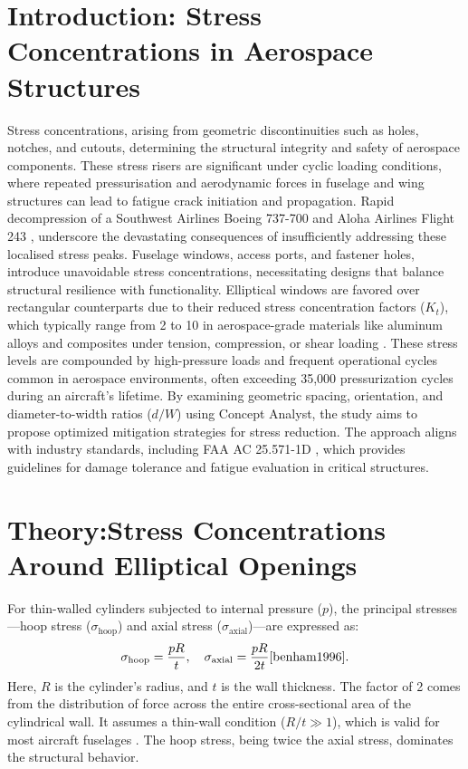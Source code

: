 \documentclass[a4paper,11pt]{article}
\begin{document}
\section{Introduction: Stress Concentrations in Aerospace Structures}
\vspace{-15pt}
Stress concentrations, arising from geometric discontinuities such as holes, notches, and cutouts, determining the structural integrity and safety of aerospace components. These stress risers are significant under cyclic loading conditions, where repeated pressurisation and aerodynamic forces in fuselage and wing structures can lead to fatigue crack initiation and propagation. Rapid decompression of a Southwest Airlines Boeing 737-700 \cite{ntsb2019} and Aloha Airlines Flight 243 \cite{ntsb1989}, underscore the devastating consequences of insufficiently addressing these localised stress peaks. Fuselage windows, access ports, and fastener holes, introduce unavoidable stress concentrations, necessitating designs that balance structural resilience with functionality. Elliptical windows are favored over rectangular counterparts due to their reduced stress concentration factors ($K_t$), which typically range from 2 to 10 in aerospace-grade materials like aluminum alloys and composites under tension, compression, or shear loading \cite{pilkey2020}. These stress levels are compounded by high-pressure loads and frequent operational cycles common in aerospace environments, often exceeding 35,000 pressurization cycles during an aircraft’s lifetime\cite{megson2016}.  By examining geometric spacing, orientation, and diameter-to-width ratios ($d/W$) using Concept Analyst, the study aims to propose optimized mitigation strategies for stress reduction. The approach aligns with industry standards, including FAA AC 25.571-1D \cite{faa_ac_25_571_1d}, which provides guidelines for damage tolerance and fatigue evaluation in critical structures. 
 
\vspace{-15pt}
\section{Theory:Stress Concentrations Around Elliptical Openings}
\vspace{-15pt}
 

For thin-walled cylinders subjected to internal pressure (\(p\)), the principal stresses—hoop stress (\(\sigma_{\text{hoop}}\)) and axial stress (\(\sigma_{\text{axial}}\))—are expressed as:
\begin{equation}
\sigma_{\text{hoop}} = \frac{pR}{t}, \quad \sigma_{\text{axial}} = \frac{pR}{2t} \cite{benham1996}.
\label{eq:thin_wall}
\end{equation}
Here, \(R\) is the cylinder’s radius, and \(t\) is the wall thickness. The factor of 2 comes from the distribution of force across the entire cross-sectional area of the cylindrical wall. It assumes a thin-wall condition (\(R/t \gg 1\)), which is valid for most aircraft fuselages \cite{young2011}. The hoop stress, being twice the axial stress, dominates the structural behavior.
\end{document}
